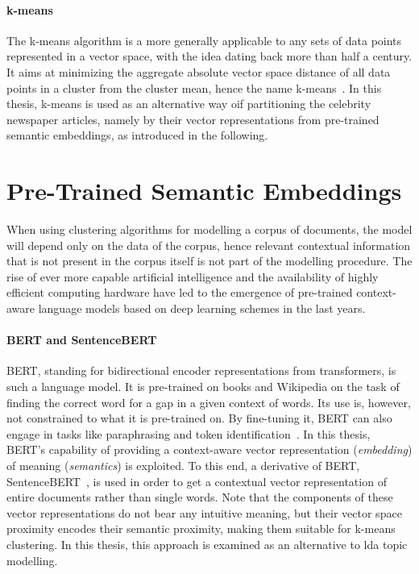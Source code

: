 \paragraph{k-means}
The k-means algorithm is a more generally applicable to any sets of data points represented in a vector space, with the idea dating back more than half a century. It aims at minimizing the aggregate absolute vector space distance of all data points in a cluster from the cluster mean, hence the name k-means~\autocite{macqueen_methods_1967}. In this thesis, k-means is used as an alternative way oif partitioning the celebrity newspaper articles, namely by their vector representations from pre-trained semantic embeddings, as introduced in the following.



\section{Pre-Trained Semantic Embeddings}\label{ch:pretrained_algorithms}
When using clustering algorithms for modelling a corpus of documents, the model will depend only on the data of the corpus, hence relevant contextual information that is not present in the corpus itself is not part of the modelling procedure. The rise of ever more capable artificial intelligence and the availability of highly efficient computing hardware have led to the emergence of pre-trained context-aware language models based on deep learning schemes in the last years.

\paragraph{BERT and SentenceBERT}\label{ch:sentencebert}
BERT, standing for bidirectional encoder representations from transformers, is such a language model. It is pre-trained on books and Wikipedia on the task of finding the correct word for a gap in a given context of words. Its use is, however, not constrained to what it is pre-trained on. By fine-tuning it, BERT can also engage in tasks like paraphrasing and token identification~\autocite{devlin_bert_2019}. In this thesis, BERT's capability of providing a context-aware vector representation (\textit{embedding}) of meaning (\textit{semantics}) is exploited. To this end, a derivative of BERT, SentenceBERT~\autocite{reimers_sentence-bert_2019}, is used in order to get a contextual vector representation of entire documents rather than single words. Note that the components of these vector representations do not bear any intuitive meaning, but their vector space proximity encodes their semantic proximity, making them suitable for k-means clustering. In this thesis, this approach is examined as an alternative to \gls{lda} topic modelling.

